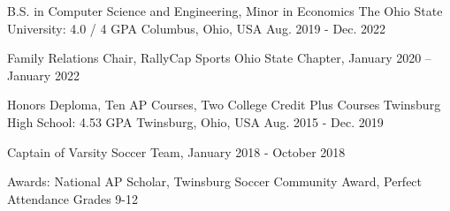 

\begin{cventries}

  \cventry
    {B.S. in Computer Science and Engineering, Minor in Economics} %
    {The Ohio State University: 4.0 / 4 GPA} %
    {Columbus, Ohio, USA} %
    {Aug. 2019 - Dec. 2022} %
    {
      \begin{cvitems} %
        \item{Family Relations Chair, RallyCap Sports Ohio State Chapter, January 2020 – January 2022}
      \end{cvitems}
    }
    
    \cventry
    {Honors Deploma, Ten AP Courses, Two College Credit Plus Courses} %
    {Twinsburg High School: 4.53 GPA} %
    {Twinsburg, Ohio, USA} %
    {Aug. 2015 - Dec. 2019} %
    {
      \begin{cvitems} %
        \item{Captain of Varsity Soccer Team, January 2018 - October 2018}
        \item{Awards: National AP Scholar, Twinsburg Soccer Community Award, Perfect Attendance Grades 9-12} 
      \end{cvitems}
    }

\end{cventries}
